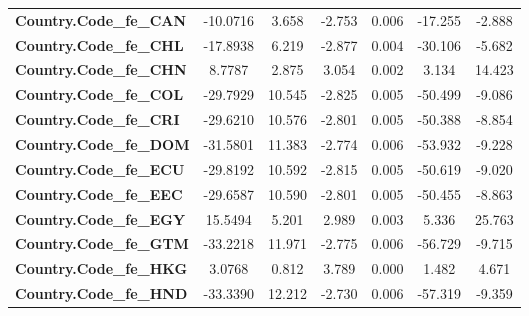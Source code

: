 \begin{center}
\begin{tabular}{lcccccc}
\textbf{Country.Code\_fe\_CAN}                                     &     -10.0716  &        3.658     &    -2.753  &         0.006        &      -17.255    &       -2.888     \\
\textbf{Country.Code\_fe\_CHL}                                     &     -17.8938  &        6.219     &    -2.877  &         0.004        &      -30.106    &       -5.682     \\
\textbf{Country.Code\_fe\_CHN}                                     &       8.7787  &        2.875     &     3.054  &         0.002        &        3.134    &       14.423     \\
\textbf{Country.Code\_fe\_COL}                                     &     -29.7929  &       10.545     &    -2.825  &         0.005        &      -50.499    &       -9.086     \\
\textbf{Country.Code\_fe\_CRI}                                     &     -29.6210  &       10.576     &    -2.801  &         0.005        &      -50.388    &       -8.854     \\
\textbf{Country.Code\_fe\_DOM}                                     &     -31.5801  &       11.383     &    -2.774  &         0.006        &      -53.932    &       -9.228     \\
\textbf{Country.Code\_fe\_ECU}                                     &     -29.8192  &       10.592     &    -2.815  &         0.005        &      -50.619    &       -9.020     \\
\textbf{Country.Code\_fe\_EEC}                                     &     -29.6587  &       10.590     &    -2.801  &         0.005        &      -50.455    &       -8.863     \\
\textbf{Country.Code\_fe\_EGY}                                     &      15.5494  &        5.201     &     2.989  &         0.003        &        5.336    &       25.763     \\
\textbf{Country.Code\_fe\_GTM}                                     &     -33.2218  &       11.971     &    -2.775  &         0.006        &      -56.729    &       -9.715     \\
\textbf{Country.Code\_fe\_HKG}                                     &       3.0768  &        0.812     &     3.789  &         0.000        &        1.482    &        4.671     \\
\textbf{Country.Code\_fe\_HND}                                     &     -33.3390  &       12.212     &    -2.730  &         0.006        &      -57.319    &       -9.359     \\

\end{tabular}
\end{center}
